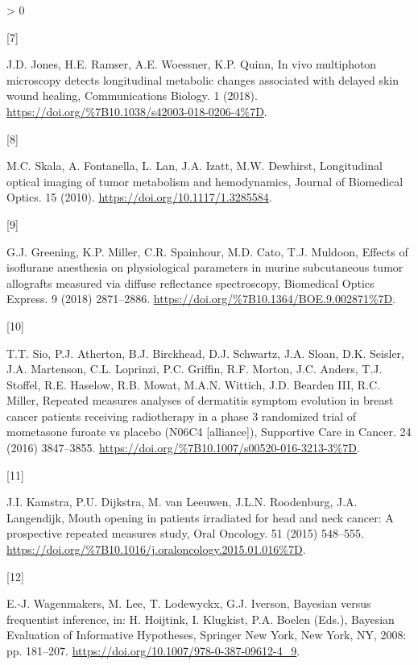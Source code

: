 \documentclass[
]{article}
\newlength{\cslhangindent}
\newlength{\csllabelwidth}
\newenvironment{CSLReferences}[2] %
 {%
  \setlength{\parindent}{0pt}
  \ifodd #1 \everypar{\setlength{\hangindent}{\cslhangindent}}\ignorespaces\fi
  \ifnum #2 > 0
  \setlength{\parskip}{#2\baselineskip}
  \fi
 }%
 {}
\newcommand{\CSLLeftMargin}[1]{\parbox[t]{\csllabelwidth}{#1}}
\newcommand{\CSLRightInline}[1]{\parbox[t]{\linewidth - \csllabelwidth}{#1}\break}
\begin{document}
\begin{CSLReferences}{0}{0}
\leavevmode\hypertarget{ref-jones2018}{}%
\CSLLeftMargin{{[}7{]} }
\CSLRightInline{J.D. Jones, H.E. Ramser, A.E. Woessner, K.P. Quinn, {In vivo multiphoton microscopy detects longitudinal metabolic changes associated with delayed skin wound healing}, {Communications Biology}. {1} (2018). \url{https://doi.org/\%7B10.1038/s42003-018-0206-4\%7D}.}

\leavevmode\hypertarget{ref-skala2010}{}%
\CSLLeftMargin{{[}8{]} }
\CSLRightInline{M.C. Skala, A. Fontanella, L. Lan, J.A. Izatt, M.W. Dewhirst, Longitudinal optical imaging of tumor metabolism and hemodynamics, Journal of Biomedical Optics. 15 (2010). \url{https://doi.org/10.1117/1.3285584}.}

\leavevmode\hypertarget{ref-greening2018}{}%
\CSLLeftMargin{{[}9{]} }
\CSLRightInline{G.J. Greening, K.P. Miller, C.R. Spainhour, M.D. Cato, T.J. Muldoon, {Effects of isoflurane anesthesia on physiological parameters in murine subcutaneous tumor allografts measured via diffuse reflectance spectroscopy}, {Biomedical Optics Express}. {9} (2018) 2871--2886. \url{https://doi.org/\%7B10.1364/BOE.9.002871\%7D}.}

\leavevmode\hypertarget{ref-sio2016}{}%
\CSLLeftMargin{{[}10{]} }
\CSLRightInline{T.T. Sio, P.J. Atherton, B.J. Birckhead, D.J. Schwartz, J.A. Sloan, D.K. Seisler, J.A. Martenson, C.L. Loprinzi, P.C. Griffin, R.F. Morton, J.C. Anders, T.J. Stoffel, R.E. Haselow, R.B. Mowat, M.A.N. Wittich, J.D. Bearden III, R.C. Miller, {Repeated measures analyses of dermatitis symptom evolution in breast cancer patients receiving radiotherapy in a phase 3 randomized trial of mometasone furoate vs placebo (N06C4 {{[}}alliance{]})}, {Supportive Care in Cancer}. {24} (2016) 3847--3855. \url{https://doi.org/\%7B10.1007/s00520-016-3213-3\%7D}.}

\leavevmode\hypertarget{ref-kamstra2015}{}%
\CSLLeftMargin{{[}11{]} }
\CSLRightInline{J.I. Kamstra, P.U. Dijkstra, M. van Leeuwen, J.L.N. Roodenburg, J.A. Langendijk, {Mouth opening in patients irradiated for head and neck cancer: A prospective repeated measures study}, {Oral Oncology}. {51} (2015) 548--555. \url{https://doi.org/\%7B10.1016/j.oraloncology.2015.01.016\%7D}.}

\leavevmode\hypertarget{ref-wagenmakers2008}{}%
\CSLLeftMargin{{[}12{]} }
\CSLRightInline{E.-J. Wagenmakers, M. Lee, T. Lodewyckx, G.J. Iverson, Bayesian versus frequentist inference, in: H. Hoijtink, I. Klugkist, P.A. Boelen (Eds.), Bayesian Evaluation of Informative Hypotheses, Springer New York, New York, NY, 2008: pp. 181--207. \url{https://doi.org/10.1007/978-0-387-09612-4_9}.}


\end{CSLReferences}
\end{document}
